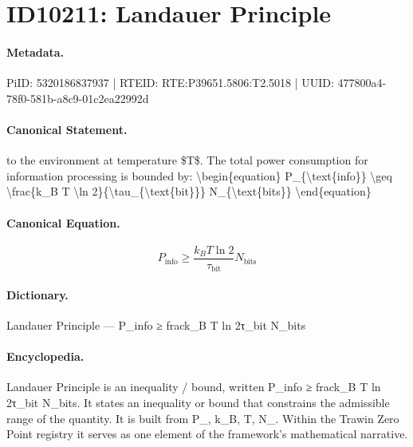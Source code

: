 \section*{ID10211: Landauer Principle}
\paragraph{Metadata.}
PiID: 5320186837937 | RTEID: RTE:P39651.5806:T2.5018 | UUID: 477800a4-78f0-581b-a8c9-01c2ea22992d

\paragraph{Canonical Statement.}
to the environment at temperature \$T\$. The total power consumption for information processing is bounded by: \textbackslash{}begin\{equation\} P\_\{\textbackslash{}text\{info\}\} \textbackslash{}geq \textbackslash{}frac\{k\_B T \textbackslash{}ln 2\}\{\textbackslash{}tau\_\{\textbackslash{}text\{bit\}\}\} N\_\{\textbackslash{}text\{bits\}\} \textbackslash{}end\{equation\}

\paragraph{Canonical Equation.}
\[
P_{\text{info}} \geq \frac{k_B T \ln 2}{\tau_{\text{bit}}} N_{\text{bits}}
\]

\paragraph{Dictionary.}
Landauer Principle — P\_info ≥ frack\_B T ln 2τ\_bit N\_bits

\paragraph{Encyclopedia.}
Landauer Principle is an inequality / bound, written P\_info ≥ frack\_B T ln 2τ\_bit N\_bits. It states an inequality or bound that constrains the admissible range of the quantity. It is built from P\_, k\_B, T, N\_. Within the Trawin Zero Point registry it serves as one element of the framework's mathematical narrative.
